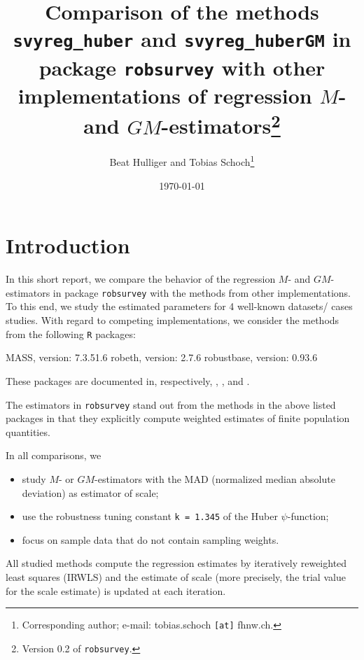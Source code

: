 \documentclass[a4paper]{scrartcl}
\begin{document}
\title{Comparison of the methods \texttt{svyreg\_huber} and \texttt{svyreg\_huberGM} in package \texttt{robsurvey} with other implementations of regression $M$- and $GM$-estimators\footnote{Version 0.2 of \texttt{robsurvey}.}} 

\author{Beat Hulliger and Tobias Schoch\footnote{Corresponding author; e-mail: tobias.schoch \texttt{[at]} fhnw.ch.}\\
  }

\date{\small\today}
\maketitle



\section{Introduction}\label{sec:intro}
In this short report, we compare the behavior of the regression $M$- and $GM$-estimators in package \texttt{robsurvey} with the methods from other implementations. To this end, we study the estimated parameters for 4 well-known datasets/ cases studies. With regard to competing implementations, we consider the methods from the following \texttt{R} packages: 
\begin{Schunk}
\begin{Soutput}
MASS, version: 7.3.51.6
robeth, version: 2.7.6
robustbase, version: 0.93.6
\end{Soutput}
\end{Schunk}
\noindent These packages are documented in, respectively, \cite{mass}, \cite{robeth}, and \cite{robustbase}. 

The estimators in \texttt{robsurvey} stand out from the methods in the above listed packages in that they explicitly compute weighted estimates of finite population quantities.   

In all comparisons, we 
\begin{itemize}
   \item study $M$- or $GM$-estimators with the MAD (normalized median absolute deviation) as estimator of scale;
   \item use the robustness tuning constant \texttt{k = 1.345} of the Huber $\psi$-function;
   \item focus on sample data that do not contain sampling weights. 
\end{itemize}
\noindent All studied methods compute the regression estimates by iteratively reweighted least squares (IRWLS) and the estimate of scale (more precisely, the trial value for the scale estimate) is updated at each iteration. 
\end{document}
